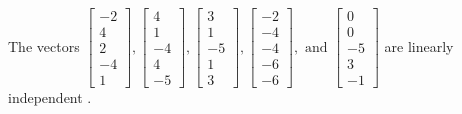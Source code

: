 \begin{exercise}
\begin{exerciseStatement}
  \end{exerciseStatement}
  \begin{exerciseAnswer}
   The vectors \(\left[\begin{array}{r}
-2 \\
4 \\
2 \\
-4 \\
1
\end{array}\right] , \left[\begin{array}{r}
4 \\
1 \\
-4 \\
4 \\
-5
\end{array}\right] , \left[\begin{array}{r}
3 \\
1 \\
-5 \\
1 \\
3
\end{array}\right] , \left[\begin{array}{r}
-2 \\
-4 \\
-4 \\
-6 \\
-6
\end{array}\right] , \text{ and } \left[\begin{array}{r}
0 \\
0 \\
-5 \\
3 \\
-1
\end{array}\right]\) are 
  	 linearly independent  .
  


  \end{exerciseAnswer}
\end{exercise}
